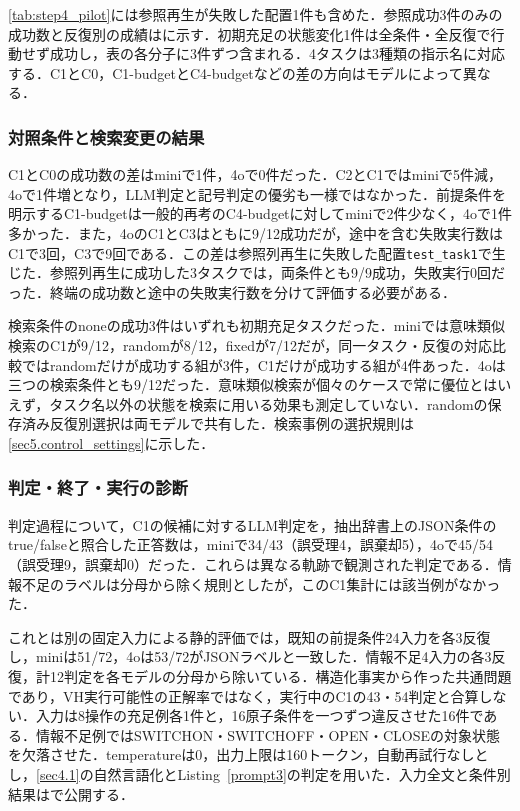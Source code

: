 \ref{tab:step4_pilot}には参照再生が失敗した配置1件も含めた．参照成功3件のみの成功数と反復別の成績はに示す．初期充足の状態変化1件は全条件・全反復で行動せず成功し，表の各分子に3件ずつ含まれる．4タスクは3種類の指示名に対応する．C1とC0，C1-budgetとC4-budgetなどの差の方向はモデルによって異なる．

\subsubsection{対照条件と検索変更の結果}
C1とC0の成功数の差はminiで1件，4oで0件だった．C2とC1ではminiで5件減，4oで1件増となり，LLM判定と記号判定の優劣も一様ではなかった．前提条件を明示するC1-budgetは一般的再考のC4-budgetに対してminiで2件少なく，4oで1件多かった．また，4oのC1とC3はともに9/12成功だが，途中を含む失敗実行数はC1で3回，C3で9回である．この差は参照列再生に失敗した配置\texttt{test\_task1}で生じた．参照列再生に成功した3タスクでは，両条件とも9/9成功，失敗実行0回だった．終端の成功数と途中の失敗実行数を分けて評価する必要がある．

検索条件のnoneの成功3件はいずれも初期充足タスクだった．miniでは意味類似検索のC1が9/12，randomが8/12，fixedが7/12だが，同一タスク・反復の対応比較ではrandomだけが成功する組が3件，C1だけが成功する組が4件あった．4oは三つの検索条件とも9/12だった．意味類似検索が個々のケースで常に優位とはいえず，タスク名以外の状態を検索に用いる効果も測定していない．randomの保存済み反復別選択は両モデルで共有した．検索事例の選択規則は\ref{sec5.control_settings}に示した．

\subsubsection{判定・終了・実行の診断}

判定過程について，C1の候補に対するLLM判定を，抽出辞書上のJSON条件のtrue/falseと照合した正答数は，miniで34/43（誤受理4，誤棄却5），4oで45/54（誤受理9，誤棄却0）だった．これらは異なる軌跡で観測された判定である．情報不足のラベルは分母から除く規則としたが，このC1集計には該当例がなかった．

これとは別の固定入力による静的評価では，既知の前提条件24入力を各3反復し，miniは51/72，4oは53/72がJSONラベルと一致した．情報不足4入力の各3反復，計12判定を各モデルの分母から除いている．構造化事実から作った共通問題であり，VH実行可能性の正解率ではなく，実行中のC1の43・54判定と合算しない．入力は8操作の充足例各1件と，16原子条件を一つずつ違反させた16件である．情報不足例ではSWITCHON・SWITCHOFF・OPEN・CLOSEの対象状態を欠落させた．temperatureは0，出力上限は160トークン，自動再試行なしとし，\ref{sec4.1}の自然言語化とListing~\ref{prompt3}の判定を用いた．入力全文と条件別結果はで公開する．

